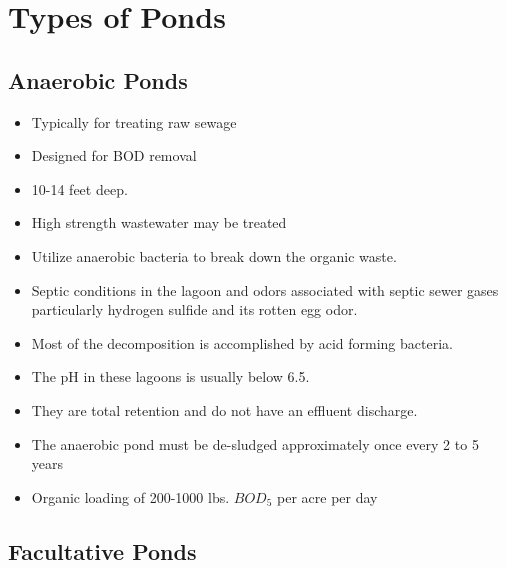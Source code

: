 \section{Types of Ponds}	

\subsection{Anaerobic Ponds}	

\begin{itemize}	
\item Typically for treating raw sewage
\item Designed for BOD removal
\item 10-14 feet deep. 
\item High strength wastewater may be treated
\item Utilize anaerobic bacteria to break down the organic waste. 
\item Septic conditions in the lagoon and odors associated with septic sewer gases particularly hydrogen sulfide and its rotten egg odor. 
\item Most of the decomposition is accomplished by acid forming bacteria. 
\item The pH in these lagoons is usually below 6.5. 
\item They are total retention and do not have an effluent discharge. 
\item The anaerobic pond must be de-sludged approximately once every 2 to 5 years
\item Organic loading of 200-1000 lbs. $BOD_5$ per acre per day
\end{itemize}

\subsection{Facultative Ponds}	

